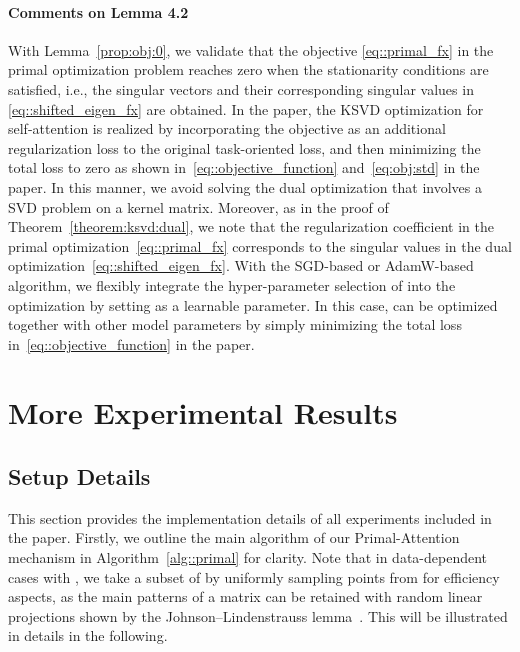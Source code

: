 \documentclass{article}
\begin{document}
\paragraph{Comments on Lemma 4.2}
With Lemma~\ref{prop:obj:0}, we validate that the objective  \eqref{eq::primal_fx} in the primal optimization problem reaches zero when the stationarity conditions are satisfied, i.e., the singular vectors and their corresponding singular values in \eqref{eq::shifted_eigen_fx} are obtained. 
In the paper, the KSVD optimization for self-attention is realized by incorporating the objective  as an additional regularization loss to the original task-oriented loss, and then minimizing the total loss to zero as shown in~\eqref{eq::objective_function} and~\eqref{eq:obj:std} in the paper.
In this manner, we avoid solving the dual optimization that involves a SVD problem on a kernel matrix.
Moreover, as in the proof of Theorem~\ref{theorem:ksvd:dual}, we note that the regularization coefficient  in the primal optimization~\eqref{eq::primal_fx} corresponds to the singular values in the dual optimization~\eqref{eq::shifted_eigen_fx}.
With the SGD-based or AdamW-based algorithm, we flexibly integrate the hyper-parameter selection of  into the optimization by setting  as a learnable parameter.
In this case,  can be optimized together with other model parameters by simply minimizing the total loss in~\eqref{eq::objective_function} in the paper.



\section{More Experimental Results}
\label{sec::more_exp}

\subsection{Setup Details}
This section provides the implementation details of all experiments included in the paper.
Firstly, we outline the main algorithm of our Primal-Attention mechanism in Algorithm~\ref{alg::primal} for clarity.
{Note that in data-dependent cases with , we take a subset of
 by uniformly sampling  points from  for efficiency aspects, as the main patterns of a matrix can be retained with random linear projections shown by the Johnson–Lindenstrauss lemma~\cite{lindenstrauss1984extensions}. 
This will be illustrated in details in the following.}
\end{document}
